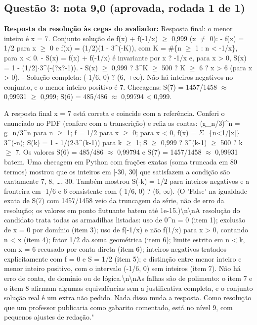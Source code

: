 \documentclass{article}%
\begin{document}
\subsection*{Questão 3: nota 9,0 (aprovada, rodada 1 de 1)}%
\textbf{Resposta da resolução às cegas do avaliador:} Resposta final: o menor inteiro é x = 7.\newline%
\newline%
Conjunto solução de f(x) + f({-}1/x) $\geq$ 0,999 (x $\neq$ 0):\newline%
{-} f(x) = 1/2 para x $\geq$ 0 e f(x) = (1/2)(1 {-} 3\^{}({-}K)), com K = \#\{n $\geq$ 1 : n < {-}1/x\}, para x < 0.\newline%
{-} S(x) = f(x) + f({-}1/x) é invariante por x ? {-}1/x e, para x > 0, S(x) = 1 {-} (1/2)$\cdot$3\^{}({-}(?x?{-}1)).\newline%
{-} S(x) $\geq$ 0,999 ? 3\^{}K $\geq$ 500 ? K $\geq$ 6 ? x > 6 (para x > 0).\newline%
{-} Solução completa: ({-}1/6, 0) ? (6, +$\infty$). Não há inteiros negativos no conjunto, e o menor inteiro positivo é 7.\newline%
\newline%
Checagens: S(7) = 1457/1458 $\approx$ 0,99931 $\geq$ 0,999; S(6) = 485/486 $\approx$ 0,99794 < 0,999.\par %
A resposta final x = 7 está correta e coincide com a referência. Conferi o enunciado no PDF (confere com a transcrição) e refiz as contas: (g\_n/3)\^{}n = g\_n/3\^{}n para n $\geq$ 1; f = 1/2 para x $\geq$ 0; para x < 0, f(x) = $\Sigma$\_\{n<1/|x|\} 3\^{}(-n); S(k) = 1 - 1/(2$\cdot$3\^{}(k-1)) para k $\geq$ 1; S $\geq$ 0,999 ? 3\^{}(k-1) $\geq$ 500 ? k $\geq$ 7. Os valores S(6) = 485/486 $\approx$ 0,99794 e S(7) = 1457/1458 $\approx$ 0,99931 batem. Uma checagem em Python com frações exatas (soma truncada em 80 termos) mostrou que os inteiros em {[}-30, 30{]} que satisfazem a condição são exatamente 7, 8, \ldots{}, 30. Também mostrou S(-k) = 1/2 para inteiros negativos e a fronteira em -1/6 e 6 consistente com (-1/6, 0) ? (6, $\infty$). (O 'False' na igualdade exata de S(7) com 1457/1458 veio da truncagem da série, não de erro da resolução; os valores em ponto flutuante batem até 1e{-}15.)\textbackslash{}n\textbackslash{}nA resolução do candidato trata todas as armadilhas listadas: uso de 0\^{}n = 0 (item 1); exclusão de x = 0 por domínio (item 3); uso de f(-1/x) e não f(1/x) para x > 0, contando n < x (item 4); fator 1/2 da soma geométrica (item 6); limite estrito em n < k, com x = 6 recusado por conta direta (item 6); inteiros negativos tratados explicitamente com f = 0 e S = 1/2 (item 5); e distinção entre menor inteiro e menor inteiro positivo, com o intervalo (-1/6, 0) sem inteiros (item 7). Não há erro de conta, de domínio ou de lógica.\textbackslash{}n\textbackslash{}nAs falhas são de polimento: o item 7 e o item 8 afirmam algumas equivalências sem a justificativa completa, e o conjunto solução real é um extra não pedido. Nada disso muda a resposta. Como resolução que um professor publicaria como gabarito comentado, está no nível 9, com pequenos ajustes de redação."%
\end{document}
